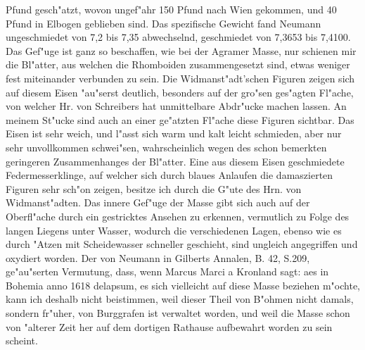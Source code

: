 \documentclass[a4paper, 11pt, oneside, polutonikogreek, german]{article}
\begin{document}
Pfund gesch"atzt, wovon ungef"ahr 150 Pfund nach Wien gekommen, und 40 Pfund in Elbogen geblieben sind. Das spezifische Gewicht fand Neumann ungeschmiedet von 7,2 bis 7,35 abwechselnd, geschmiedet von 7,3653 bis 7,4100. Das Gef"uge ist ganz so beschaffen, wie bei der Agramer Masse, nur schienen mir die Bl"atter, aus welchen die Rhomboiden zusammengesetzt sind, etwas weniger fest miteinander verbunden zu sein. Die Widmanst"adt'schen Figuren zeigen sich auf diesem Eisen "au"serst deutlich, besonders auf der gro"sen ges"agten Fl"ache, von welcher Hr. von Schreibers hat unmittelbare Abdr"ucke machen lassen. An meinem St"ucke sind auch an einer ge"atzten Fl"ache diese Figuren sichtbar. Das Eisen ist sehr weich, und l"asst sich warm und kalt leicht schmieden, aber nur sehr unvollkommen schwei"sen, wahrscheinlich wegen des schon bemerkten geringeren Zusammenhanges der Bl"atter. Eine aus diesem Eisen geschmiedete Federmesserklinge, auf welcher sich durch blaues Anlaufen die damaszierten Figuren sehr sch"on zeigen, besitze ich durch die G"ute des Hrn. von Widmanst"adten. Das innere Gef"uge der Masse gibt sich auch auf der Oberfl"ache durch ein gestricktes Ansehen zu erkennen, vermutlich zu Folge des langen Liegens unter Wasser, wodurch die verschiedenen Lagen, ebenso wie es durch "Atzen mit Scheidewasser schneller geschieht, sind ungleich angegriffen und oxydiert worden. Der von Neumann in Gilberts Annalen, B. 42, S.209, ge"au"serten Vermutung, dass, wenn Marcus Marci a Kronland sagt: aes in Bohemia anno 1618 delapsum, es sich vielleicht auf diese Masse beziehen m"ochte, kann ich deshalb nicht beistimmen, weil dieser Theil von B"ohmen nicht damals, sondern fr"uher, von Burggrafen ist verwaltet worden, und weil die Masse schon von "alterer Zeit her auf dem dortigen Rathause aufbewahrt worden zu sein scheint.
\end{document}
